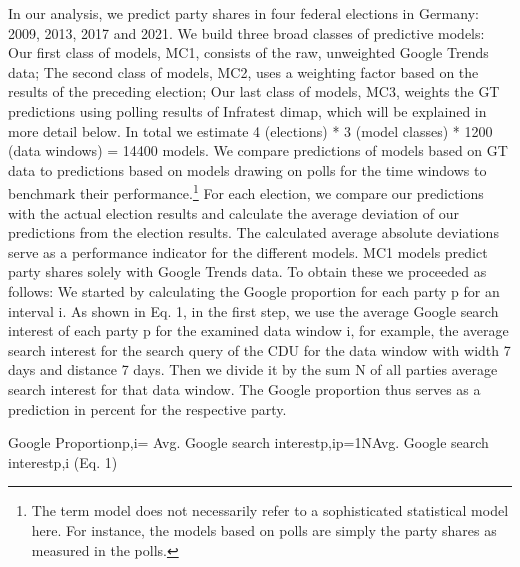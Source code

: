 \documentclass[
  letterpaper,
  DIV=11,
  numbers=noendperiod]{scrartcl}
\begin{document}
In our analysis, we predict party shares in four federal elections in
Germany: 2009, 2013, 2017 and 2021. We build three broad classes of
predictive models: Our first class of models, MC1, consists of the raw,
unweighted Google Trends data; The second class of models, MC2, uses a
weighting factor based on the results of the preceding election; Our
last class of models, MC3, weights the GT predictions using polling
results of Infratest dimap, which will be explained in more detail
below. In total we estimate 4 (elections) * 3 (model classes) * 1200
(data windows) = 14400 models. We compare predictions of models based on
GT data to predictions based on models drawing on polls for the time
windows to benchmark their performance.\footnote{The term model does not
  necessarily refer to a sophisticated statistical model here. For
  instance, the models based on polls are simply the party shares as
  measured in the polls.} For each election, we compare our predictions
with the actual election results and calculate the average deviation of
our predictions from the election results. The calculated average
absolute deviations serve as a performance indicator for the different
models. MC1 models predict party shares solely with Google Trends data.
To obtain these we proceeded as follows: We started by calculating the
Google proportion for each party p for an interval i. As shown in Eq. 1,
in the ﬁrst step, we use the average Google search interest of each
party p for the examined data window i, for example, the average search
interest for the search query of the CDU for the data window with width
7 days and distance 7 days. Then we divide it by the sum N of all
parties average search interest for that data window. The Google
proportion thus serves as a prediction in percent for the respective
party.

Google Proportionp,i= Avg. Google search interestp,ip=1NAvg. Google
search interestp,i (Eq. 1)
\end{document}
